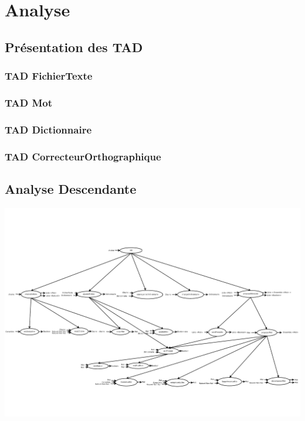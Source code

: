 \section{Analyse}
	\subsection{Présentation des TAD}
		\subsubsection{TAD FichierTexte}
			
			
		\subsubsection{TAD Mot}
			
			
		\subsubsection{TAD Dictionnaire}
			
			
		\subsubsection{TAD CorrecteurOrthographique}
			
			
	\begin{landscape}
		\subsection{Analyse Descendante}
			\includegraphics[scale=0.6]{images/AnalyseDescendante.pdf}
	\end{landscape}
